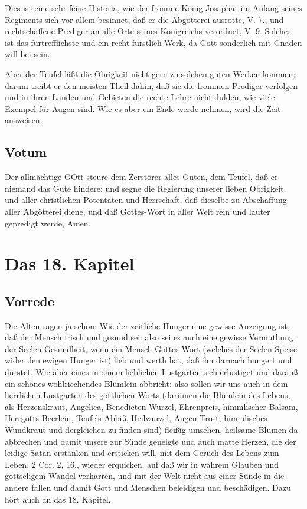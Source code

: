Dies ist eine sehr feine Historia, wie der fromme König Josaphat im Anfang seines Regiments sich vor allem besinnet, daß er die Abgötterei ausrotte, V. 7., und rechtschaffene Prediger an alle Orte seines Königreichs verordnet, V. 9. Solches ist das fürtrefflichste und ein recht fürstlich Werk, da Gott sonderlich mit Gnaden will bei sein.

Aber der Teufel läßt die Obrigkeit nicht gern zu solchen guten Werken kommen; darum treibt er den meisten Theil dahin, daß sie die frommen Prediger verfolgen und in ihren Landen und Gebieten die rechte Lehre nicht dulden, wie viele Exempel für Augen sind. Wie es aber ein Ende werde nehmen, wird die Zeit ausweisen.

\section{Votum}

Der allmächtige GOtt steure dem Zerstörer alles Guten, dem Teufel, daß er niemand das Gute hindere; und segne die Regierung unserer lieben Obrigkeit, und aller christlichen Potentaten und Herrschaft, daß dieselbe zu Abschaffung aller Abgötterei diene, und daß Gottes-Wort in aller Welt rein und lauter gepredigt werde, Amen.

\chapter{Das 18. Kapitel}

\section{Vorrede}

Die Alten sagen ja schön: Wie der zeitliche Hunger eine gewisse Anzeigung ist, daß der Mensch frisch und gesund sei: also sei es auch eine gewisse Vermuthung der Seelen Gesundheit, wenn ein Mensch Gottes Wort (welches der Seelen Speise wider den ewigen Hunger ist) lieb und werth hat, daß ihn darnach hungert und dürstet. Wie aber eines in einem lieblichen Lustgarten sich erlustiget und darauß ein schönes wohlriechendes Blümlein abbricht: also sollen wir uns auch in dem herrlichen Lustgarten des göttlichen Worts (darinnen die Blümlein des Lebens, als Herzenskraut, Angelica, Benedicten-Wurzel, Ehrenpreis, himmlischer Balsam, Herrgotts Beerlein, Teufels Abbiß, Heilwurzel, Augen-Trost, himmlisches Wundkraut und dergleichen zu finden sind) fleißig umsehen, heilsame Blumen da abbrechen und damit unsere zur Sünde geneigte und auch matte Herzen, die der leidige Satan erstänken und ersticken will, mit dem Geruch des Lebens zum Leben, 2 Cor. 2, 16., wieder erquicken, auf daß wir in wahrem Glauben und gottseligem Wandel verharren, und mit der Welt nicht aus einer Sünde in die andere fallen und damit Gott und Menschen beleidigen und beschädigen. Dazu hört auch an das 18. Kapitel.

